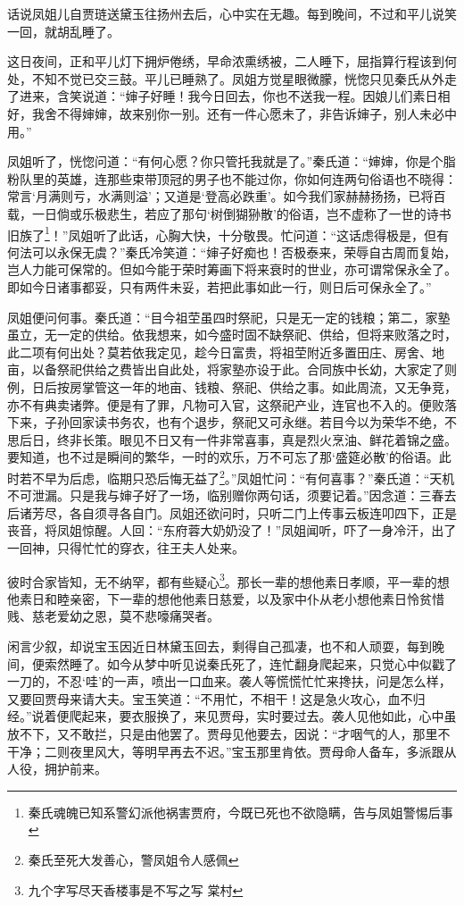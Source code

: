 \documentclass[12pt,oneside]{book}
\begin{document}
话说凤姐儿自贾琏送黛玉往扬州去后，心中实在无趣。每到晚间，不过和平儿说笑一回，就胡乱睡了。

这日夜间，正和平儿灯下拥炉倦绣，早命浓熏绣被，二人睡下，屈指算行程该到何处，不知不觉已交三鼓。平儿已睡熟了。凤姐方觉星眼微朦，恍惚只见秦氏从外走了进来，含笑说道：“婶子好睡！我今日回去，你也不送我一程。因娘儿们素日相好，我舍不得婶婶，故来别你一别。还有一件心愿未了，非告诉婶子，别人未必中用。”

凤姐听了，恍惚问道：“有何心愿？你只管托我就是了。”秦氏道：“婶婶，你是个脂粉队里的英雄，连那些束带顶冠的男子也不能过你，你如何连两句俗语也不晓得：常言‘月满则亏，水满则溢’；又道是‘登高必跌重’。如今我们家赫赫扬扬，已将百载，一日倘或乐极悲生，若应了那句‘树倒猢狲散’的俗语，岂不虚称了一世的诗书旧族了\footnote{秦氏魂魄已知系警幻派他祸害贾府，今既已死也不欲隐瞒，告与凤姐警惕后事}！”凤姐听了此话，心胸大快，十分敬畏。忙问道：“这话虑得极是，但有何法可以永保无虞？”秦氏冷笑道：“婶子好痴也！否极泰来，荣辱自古周而复始，岂人力能可保常的。但如今能于荣时筹画下将来衰时的世业，亦可谓常保永全了。即如今日诸事都妥，只有两件未妥，若把此事如此一行，则日后可保永全了。”

凤姐便问何事。秦氏道：“目今祖茔虽四时祭祀，只是无一定的钱粮；第二，家塾虽立，无一定的供给。依我想来，如今盛时固不缺祭祀、供给，但将来败落之时，此二项有何出处？莫若依我定见，趁今日富贵，将祖茔附近多置田庄、房舍、地亩，以备祭祀供给之费皆出自此处，将家塾亦设于此。合同族中长幼，大家定了则例，日后按房掌管这一年的地亩、钱粮、祭祀、供给之事。如此周流，又无争竞，亦不有典卖诸弊。便是有了罪，凡物可入官，这祭祀产业，连官也不入的。便败落下来，子孙回家读书务农，也有个退步，祭祀又可永继。若目今以为荣华不绝，不思后日，终非长策。眼见不日又有一件非常喜事，真是烈火烹油、鲜花着锦之盛。要知道，也不过是瞬间的繁华，一时的欢乐，万不可忘了那‘盛筵必散’的俗语。此时若不早为后虑，临期只恐后悔无益了\footnote{秦氏至死大发善心，警凤姐令人感佩}。”凤姐忙问：“有何喜事？”秦氏道：“天机不可泄漏。只是我与婶子好了一场，临别赠你两句话，须要记着。”因念道：三春去后诸芳尽，各自须寻各自门。凤姐还欲问时，只听二门上传事云板连叩四下，正是丧音，将凤姐惊醒。人回：“东府蓉大奶奶没了！”凤姐闻听，吓了一身冷汗，出了一回神，只得忙忙的穿衣，往王夫人处来。

彼时合家皆知，无不纳罕，都有些疑心\footnote{九个字写尽天香楼事是不写之写 棠村}。那长一辈的想他素日孝顺，平一辈的想他素日和睦亲密，下一辈的想他他素日慈爱，以及家中仆从老小想他素日怜贫惜贱、慈老爱幼之恩，莫不悲嚎痛哭者。

闲言少叙，却说宝玉因近日林黛玉回去，剩得自己孤凄，也不和人顽耍，每到晚间，便索然睡了。如今从梦中听见说秦氏死了，连忙翻身爬起来，只觉心中似戳了一刀的，不忍‘哇’的一声，喷出一口血来。袭人等慌慌忙忙来搀扶，问是怎么样，又要回贾母来请大夫。宝玉笑道：“不用忙，不相干！这是急火攻心，血不归经。”说着便爬起来，要衣服换了，来见贾母，实时要过去。袭人见他如此，心中虽放不下，又不敢拦，只是由他罢了。贾母见他要去，因说：“才咽气的人，那里不干净；二则夜里风大，等明早再去不迟。”宝玉那里肯依。贾母命人备车，多派跟从人役，拥护前来。
\end{document}
